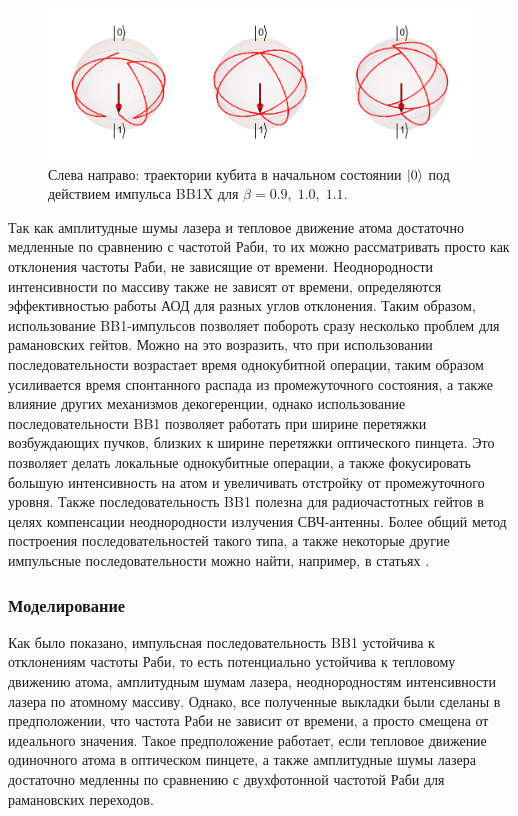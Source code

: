 \begin{figure}[tb]
	\centering
	\includegraphics[width=1.0\textwidth]{images/BB1_Paths.pdf}
	\caption{Слева направо: траектории кубита в начальном состоянии $\left| 0 \right\rangle$ под действием импульса BB1X для $\beta=0.9, \; 1.0, \; 1.1.$}
	\label{fig:BB1}
\end{figure}

Так как амплитудные шумы лазера и тепловое движение атома достаточно медленные по сравнению с частотой Раби, то их можно рассматривать просто как отклонения частоты Раби, не зависящие от времени. Неоднородности интенсивности по массиву также не зависят от времени, определяются эффективностью работы АОД для разных углов отклонения. Таким образом, использование BB1-импульсов позволяет побороть сразу несколько проблем для рамановских гейтов. Можно на это возразить, что при использовании последовательности возрастает время однокубитной операции, таким образом усиливается время спонтанного распада из промежуточного состояния, а также влияние других механизмов декогеренции, однако использование последовательности BB1 позволяет работать при ширине перетяжки возбуждающих пучков, близких к ширине перетяжки оптического пинцета. Это позволяет делать локальные однокубитные операции, а также фокусировать большую интенсивность на атом и увеличивать отстройку от промежуточного уровня. Также последовательность BB1 полезна для радиочастотных гейтов в целях компенсации неоднородности излучения СВЧ-антенны. Более общий метод построения последовательностей такого типа, а также некоторые другие импульсные последовательности можно найти, например, в статьях \cite{PhysRevA.83.053420,Chuang_Composite}.

\subsubsection{Моделирование}

Как было показано, импульсная последовательность BB1 устойчива к отклонениям частоты Раби, то есть потенциально устойчива к тепловому движению атома, амплитудным шумам лазера, неоднородностям интенсивности лазера по атомному массиву. Однако, все полученные выкладки были сделаны в предположении, что частота Раби не зависит от времени, а просто смещена от идеального значения. Такое предположение работает, если тепловое движение одиночного атома в оптическом пинцете, а также амплитудные шумы лазера достаточно медленны по сравнению с двухфотонной частотой Раби для рамановских переходов. 

